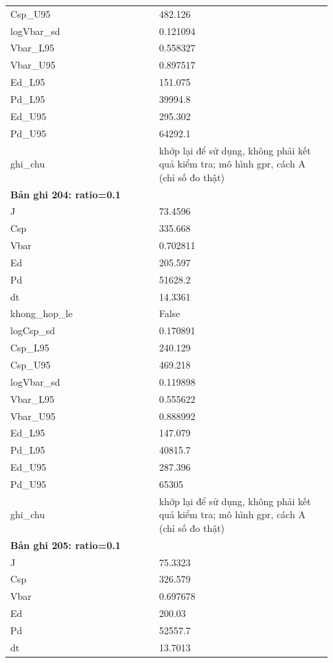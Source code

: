 \begin{longtable}{p{0.43\linewidth}p{0.50\linewidth}}
Csp\_\allowbreak U95 & 482.126 \\
logVbar\_\allowbreak sd & 0.121094 \\
Vbar\_\allowbreak L95 & 0.558327 \\
Vbar\_\allowbreak U95 & 0.897517 \\
Ed\_\allowbreak L95 & 151.075 \\
Pd\_\allowbreak L95 & 39994.8 \\
Ed\_\allowbreak U95 & 295.302 \\
Pd\_\allowbreak U95 & 64292.1 \\
ghi\_\allowbreak chu & khớp lại để sử dụng, không phải kết quả kiểm tra; mô hình gpr, cách A (chỉ số đo thật) \\
\midrule
\multicolumn{2}{p{0.95\linewidth}}{\textbf{Bản ghi 204: ratio=0.1}} \\
J & 73.4596 \\
Csp & 335.668 \\
Vbar & 0.702811 \\
Ed & 205.597 \\
Pd & 51628.2 \\
dt & 14.3361 \\
khong\_\allowbreak hop\_\allowbreak le & False \\
logCsp\_\allowbreak sd & 0.170891 \\
Csp\_\allowbreak L95 & 240.129 \\
Csp\_\allowbreak U95 & 469.218 \\
logVbar\_\allowbreak sd & 0.119898 \\
Vbar\_\allowbreak L95 & 0.555622 \\
Vbar\_\allowbreak U95 & 0.888992 \\
Ed\_\allowbreak L95 & 147.079 \\
Pd\_\allowbreak L95 & 40815.7 \\
Ed\_\allowbreak U95 & 287.396 \\
Pd\_\allowbreak U95 & 65305 \\
ghi\_\allowbreak chu & khớp lại để sử dụng, không phải kết quả kiểm tra; mô hình gpr, cách A (chỉ số đo thật) \\
\midrule
\multicolumn{2}{p{0.95\linewidth}}{\textbf{Bản ghi 205: ratio=0.1}} \\
J & 75.3323 \\
Csp & 326.579 \\
Vbar & 0.697678 \\
Ed & 200.03 \\
Pd & 52557.7 \\
dt & 13.7013 \\

\end{longtable}
